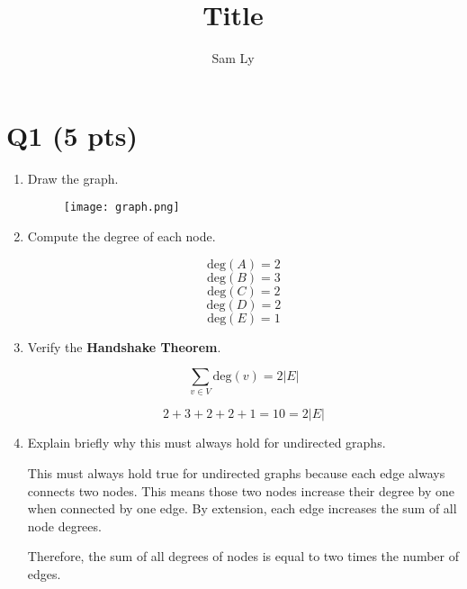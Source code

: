 \documentclass{article}
\title{Title}
\author{Sam Ly}
\begin{document}
\maketitle

\section*{Q1 (5 pts)}

\begin{enumerate}
    \item {
        Draw the graph.
        \begin{figure}[htbp]
            \centering
            \texttt{[image: graph.png]}
        \end{figure}
    }

    \item {
        Compute the degree of each node.

        \[ \text{deg}(A) = 2 \]
        \[ \text{deg}(B) = 3 \]
        \[ \text{deg}(C) = 2 \]
        \[ \text{deg}(D) = 2 \]
        \[ \text{deg}(E) = 1 \]
    }

    \item {
        Verify the \textbf{Handshake Theorem}.

        \[\sum_{v \in V}{\text{deg}(v)} = 2 |E| \]

        \[2+3+2+2+1 = 10 = 2 |E| \]
    }

    \item {
        Explain briefly why this must always hold for undirected graphs.

        This must always hold true for undirected graphs because each edge
        always connects two nodes. This means those two nodes increase their
        degree by one when connected by one edge. By extension, each edge 
        increases the sum of all node degrees. 

        Therefore, the sum of all degrees of nodes is equal to two times the 
        number of edges.
    }
\end{enumerate}
\end{document}
